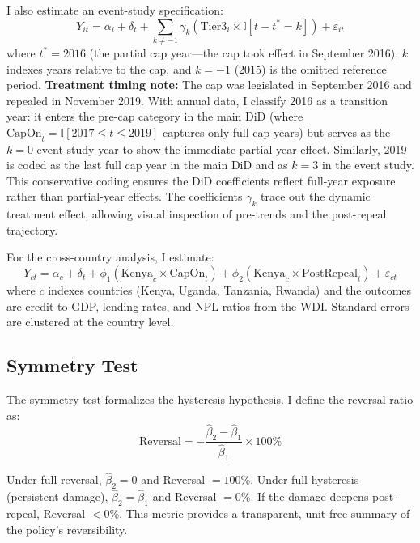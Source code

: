 \documentclass[12pt]{article}
\newcommand{\ind}{\mathbb{I}}
\begin{document}
I also estimate an event-study specification:
\begin{equation}
    Y_{it} = \alpha_i + \delta_t + \sum_{k \neq -1} \gamma_k (\text{Tier3}_i \times \ind[t - t^* = k]) + \varepsilon_{it}
    \label{eq:event}
\end{equation}
where $t^* = 2016$ (the partial cap year---the cap took effect in September 2016), $k$ indexes years relative to the cap, and $k = -1$ (2015) is the omitted reference period. \textbf{Treatment timing note:} The cap was legislated in September 2016 and repealed in November 2019. With annual data, I classify 2016 as a transition year: it enters the pre-cap category in the main DiD (where $\text{CapOn}_t = \ind[2017 \leq t \leq 2019]$ captures only full cap years) but serves as the $k=0$ event-study year to show the immediate partial-year effect. Similarly, 2019 is coded as the last full cap year in the main DiD and as $k=3$ in the event study. This conservative coding ensures the DiD coefficients reflect full-year exposure rather than partial-year effects. The coefficients $\gamma_k$ trace out the dynamic treatment effect, allowing visual inspection of pre-trends and the post-repeal trajectory.

For the cross-country analysis, I estimate:
\begin{equation}
    Y_{ct} = \alpha_c + \delta_t + \phi_1 (\text{Kenya}_c \times \text{CapOn}_t) + \phi_2 (\text{Kenya}_c \times \text{PostRepeal}_t) + \varepsilon_{ct}
    \label{eq:crosscountry}
\end{equation}
where $c$ indexes countries (Kenya, Uganda, Tanzania, Rwanda) and the outcomes are credit-to-GDP, lending rates, and NPL ratios from the WDI. Standard errors are clustered at the country level.

\subsection{Symmetry Test}

The symmetry test formalizes the hysteresis hypothesis. I define the reversal ratio as:
\begin{equation}
    \text{Reversal} = -\frac{\hat{\beta}_2 - \hat{\beta}_1}{\hat{\beta}_1} \times 100\%
    \label{eq:symmetry}
\end{equation}

Under full reversal, $\hat{\beta}_2 = 0$ and Reversal $= 100\%$. Under full hysteresis (persistent damage), $\hat{\beta}_2 = \hat{\beta}_1$ and Reversal $= 0\%$. If the damage deepens post-repeal, Reversal $< 0\%$. This metric provides a transparent, unit-free summary of the policy's reversibility.
\end{document}
